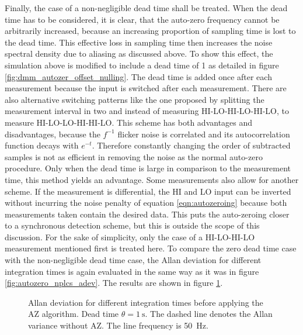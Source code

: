 Finally, the case of a non-negligible dead time shall be treated. When the dead time has to be considered, it is clear, that the auto-zero frequency cannot be arbitrarily increased, because an increasing proportion of sampling time is lost to the dead time. This effective loss in sampling time then increases the noise spectral density due to aliasing as discussed above. To show this effect, the simulation above is modified to include a dead time of \qty{1}{\plc} as detailed in figure \ref{fig:dmm_autozer_offset_nulling}. The dead time is added once after each measurement because the input is switched after each measurement. There are also alternative switching patterns like the one proposed by \citeauthor{autozero_with_dead_time} \cite{autozero_with_dead_time} splitting the measurement interval in two and instead of measuring HI-LO-HI-LO-HI-LO, to measure HI-LO-LO-HI-HI-LO. This scheme has both advantages and disadvantages, because the $f^{-1}$ flicker noise is correlated and its autocorrelation function decays with $e^{-t}$. Therefore constantly changing the order of subtracted samples is not as efficient in removing the noise as the normal auto-zero procedure. Only when the dead time is large in comparison to the measurement time, this method yields an advantage. Some measurements also allow for another scheme. If the measurement is differential, the HI and LO input can be inverted without incurring the noise penalty of equation \ref{eqn:autozeroing} because both measurements taken contain the desired data. This puts the auto-zeroing closer to a synchronous detection scheme, but this is outside the scope of this discussion. For the sake of simplicity, only the case of a HI-LO-HI-LO measurement mentioned first is treated here. To compare the zero dead time case with the non-negligible dead time case, the Allan deviation for different integration times is again evaluated in the same way as it was in figure \ref{fig:autozero_nplcs_adev}. The results are shown in figure \ref{fig:autozero_deadtime_nplcs_adev}.
\begin{figure}[ht]
    \centering
    
    \caption{Allan deviation for different integration times before applying the AZ algorithm. Dead time $\theta = \qty{1}{\s}$. The dashed line denotes the Allan variance without AZ. The line frequency is \qty{50}{\Hz}.}
    \label{fig:autozero_deadtime_nplcs_adev}
\end{figure}

